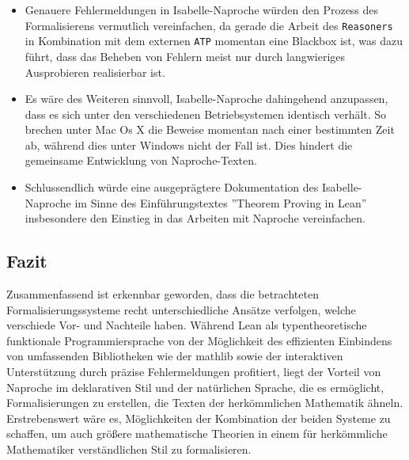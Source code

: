 \documentclass[a4paper,12pt]{scrartcl}
\begin{document}
\begin{itemize}
\item Genauere Fehlermeldungen in Isabelle-Naproche würden den Prozess des Formalisierens vermutlich vereinfachen, da gerade die Arbeit des \verb!Reasoners! in Kombination mit dem externen \verb!ATP! momentan eine Blackbox ist, was dazu führt, dass das Beheben von Fehlern meist nur durch langwieriges Ausprobieren realisierbar ist.

\item Es wäre des Weiteren sinnvoll, Isabelle-Naproche dahingehend anzupassen, dass es sich unter den verschiedenen Betriebsystemen identisch verhält. So brechen unter Mac Os X die Beweise momentan nach einer bestimmten Zeit ab, während dies unter Windows nicht der Fall ist. Dies hindert die gemeinsame Entwicklung von Naproche-Texten.

\item Schlussendlich würde eine ausgeprägtere Dokumentation des Isabelle-Naproche im Sinne des Einführungstextes ''Theorem Proving in Lean'' \cite{bibtex.e} insbesondere den Einstieg in das Arbeiten mit Naproche vereinfachen.

\end{itemize}

\subsection{Fazit}

Zusammenfassend ist erkennbar geworden, dass die betrachteten Formalisierungssysteme recht unterschiedliche Ansätze verfolgen, welche verschiede Vor- und Nachteile haben. Während Lean als typentheoretische funktionale Programmiersprache von der Möglichkeit des effizienten Einbindens von umfassenden Bibliotheken wie der mathlib sowie der interaktiven Unterstützung durch präzise Fehlermeldungen profitiert,
liegt der Vorteil von Naproche im deklarativen Stil und der natürlichen Sprache, die es ermöglicht, Formalisierungen zu erstellen, die Texten der herkömmlichen Mathematik ähneln.
Erstrebenswert wäre es, Möglichkeiten der Kombination der beiden Systeme zu schaffen, um auch größere mathematische Theorien in einem für herkömmliche Mathematiker verständlichen Stil zu formalisieren.

\newpage


\end{document}
